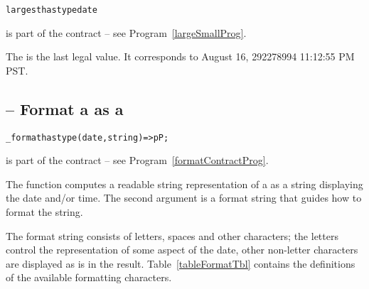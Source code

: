 {\begin{alltt}
largest has type date
\end{alltt}
 is part of the  contract -- see Program~\vref{largeSmallProg}.

The   is the last legal  value. It corresponds to August 16, 292278994 11:12:55 PM PST.


\subsection{ -- Format a  as a }
\label{formatDate}

\begin{alltt}
\_format has type (date,string)=>pP;
\end{alltt}

\begin{aside}
 is part of the  contract -- see Program~\vref{formatContractProg}.
\end{aside}

The  function computes a readable string representation of a  as a string displaying the date and/or time. The second argument is a format string that guides how to format the string.

The format string consists of letters, spaces and other characters; the letters control the representation of some aspect of the date, other non-letter characters are displayed as is in the result. Table~\vref{tableFormatTbl} contains the definitions of the available formatting characters.

}
